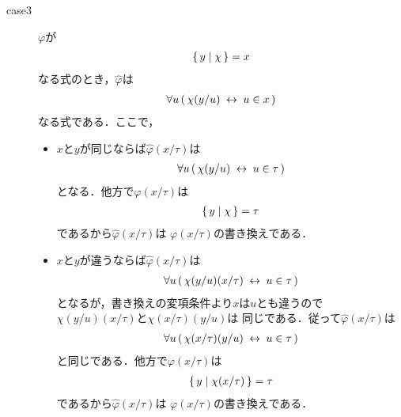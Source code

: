 \begin{metaprf}
\begin{description}
\begin{description}
					\item[case3] $\varphi$が
						\begin{align}
							\{\, y \mid \chi\, \} = x
						\end{align}
						なる式のとき，$\widehat{\varphi}$は
						\begin{align}
							\forall u\, (\, \chi(y/u) \hspace{0.25em}\leftrightarrow\hspace{0.25em} u \in x\, )
						\end{align}
						なる式である．ここで，
						\begin{itemize}
							\item $x$と$y$が同じならば$\widehat{\varphi}(x/\tau)$は
								\begin{align}
									\forall u\, (\, \chi(y/u) \hspace{0.25em}\leftrightarrow\hspace{0.25em} u \in \tau\, )
								\end{align}
								となる．他方で$\varphi(x/\tau)$は
								\begin{align}
									\{\, y \mid \chi\, \} = \tau
								\end{align}
								であるから$\widehat{\varphi}(x/\tau)$は
								$\varphi(x/\tau)$の書き換えである．
								
							\item $x$と$y$が違うならば$\widehat{\varphi}(x/\tau)$は
								\begin{align}
									\forall u\, (\, \chi(y/u)(x/\tau) \hspace{0.25em}\leftrightarrow\hspace{0.25em} u \in \tau\, )
								\end{align}
								となるが，書き換えの変項条件より$x$は$u$とも違うので
								$\chi(y/u)(x/\tau)$と$\chi(x/\tau)(y/u)$は
								同じである．従って$\widehat{\varphi}(x/\tau)$は
								\begin{align}
									\forall u\, (\, \chi(x/\tau)(y/u) \hspace{0.25em}\leftrightarrow\hspace{0.25em} u \in \tau\, )
								\end{align}
								と同じである．他方で$\varphi(x/\tau)$は
								\begin{align}
									\{\, y \mid \chi(x/\tau)\, \} = \tau
								\end{align}
								であるから$\widehat{\varphi}(x/\tau)$は
								$\varphi(x/\tau)$の書き換えである．
						\end{itemize}
						

\end{description}
\end{description}
\end{metaprf}
